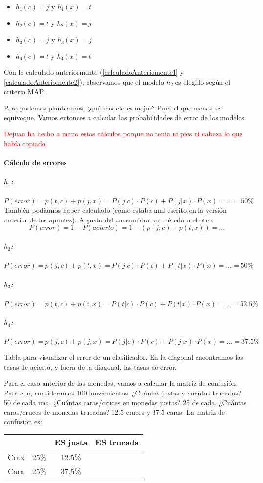 \documentclass{apuntes}
\begin{document}
\begin{example}
\begin{itemize}
	\item $h_1(c) = j$ y $h_1(x) = t$ 
	\item $h_2(c) = t$ y $h_2(x) = j$ 
	\item $h_3(c) = j$ y $h_3(x) = j$ 
	\item $h_4(c) = t$ y $h_4(x) = t$ 
\end{itemize}

Con lo calculado anteriormente (\ref{calculadoAnteriomente1} y \ref{calculadoAnteriomente2}), observamos que el modelo $h_2$ es elegido según el criterio MAP. 

Pero podemos plantearnos, ¿qué modelo es mejor? Pues el que menos se equivoque. Vamos entonces a calcular las probabilidades de error de los modelos.

\textcolor{red}{Dejuan ha hecho a mano estos cálculos porque no tenía ni pies ni cabeza lo que había copiado.}

\paragraph{Cálculo de errores}
\subparagraph{$h_1$:} $P(error) = p(t,c) + p(j,x) = P(j|c)·P(c) + P(j|x)·P(x) = ... = 50\% $
También podíamos haber calculado (como estaba mal escrito en la versión anterior de los apuntes). A gusto del consumidor un método o el otro.
\[P(error) = 1-P(acierto) = 1 - (p(j,c) + p(t,x)) = ...\]

\subparagraph{$h_2$:} 
$P(error) = p(j,c) + p(t,x) = P(j|c)·P(c) + P(t|x)·P(x) = ... = 50\%$
\subparagraph{$h_3$:} 
$P(error) = p(t,c) + p(t,x) = P(t|c)·P(c) + P(t|x)·P(x) = ... = 62.5\%$
\subparagraph{$h_4$:} 
$P(error) = p(j,c) + p(j,x) = P(j|c)·P(c) + P(j|x)·P(x) = ... = 37.5\%$
\end{example}


 \begin{defn}
 	Tabla para visualizar el error de un clasificador. En la diagonal encontramos las tasas de acierto, y fuera de la diagonal, las tasas de error.
 \end{defn}


Para el caso anterior de las monedas, vamos a calcular la matriz de confusión. Para ello, consideramos 100 lanzamientos. ¿Cuántas justas y cuantas trucadas? 50 de cada una. ¿Cuántas caras/cruces en monedas justas? 25 de cada. ¿Cuántas caras/cruces de monedas trucadas? 12.5 cruces y 37.5 caras. La matriz de confusión es:

\begin{center}
\begin{tabular}{cc|cc}
 && ES justa & ES trucada \\\hline
 Cruz & 25\% & 12.5\%\\
 Cara & 25\% & 37.5\%
\end{tabular}
\end{center}
\end{document}
